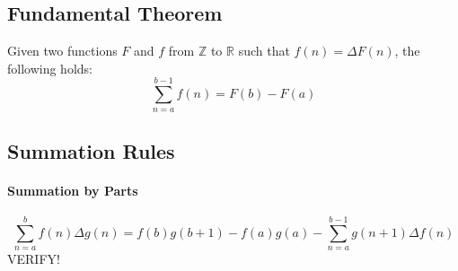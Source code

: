 


\subsection{Fundamental Theorem}
Given two functions $F$ and $f$ from $\mathbb{Z}$ to $\mathbb{R}$ such that $f(n) = \Delta F(n)$, the following holds:
\begin{equation}
 \sum_{n=a}^{b-1} f(n) = F(b) - F(a)
\end{equation}








\subsection{Summation Rules}

\paragraph{Summation by Parts}

\begin{equation}
\sum_{n=a}^{b} f(n) \Delta g(n) 
=
f(b) g(b+1) - f(a) g(a) - \sum_{n=a}^{b-1} g(n+1) \Delta f(n)
\end{equation}
VERIFY!










